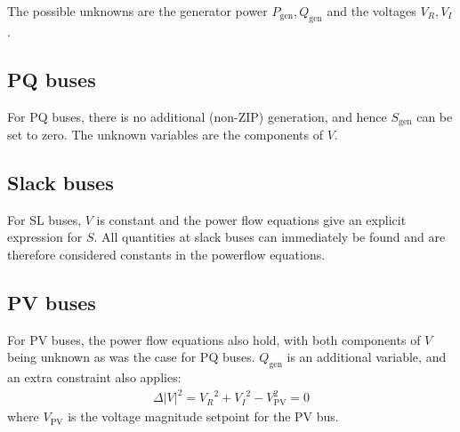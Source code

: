 \documentclass[10pt]{article}
\newcommand{\Vr}{{V_R}}
\newcommand{\Vi}{{V_I}}
\begin{document}
The possible unknowns are the generator power $P_\text{gen}, Q_\text{gen}$ and the voltages $\Vr, \Vi$.

\subsection{PQ buses}
For PQ buses, there is no additional (non-ZIP) generation, and hence $S_{\text{gen}}$ can be set to zero. The unknown variables are the components of $V$.
\subsection{Slack buses}
For SL buses, $V$ is constant and the power flow equations give an explicit expression for $S$. All quantities at slack buses can immediately be found and are therefore considered constants in the powerflow equations.
\subsection{PV buses}
For PV buses, the power flow equations also hold, with both components of $V$ being unknown as was the case for PQ buses. $Q_{\text{gen}}$ is an additional variable, and an extra constraint also applies:
\begin{align}
\Delta |V|^2 = \Vr^2 + \Vi^2 - V_\text{PV}^2 = 0
\label{EQ_POWERFLOW_PV_CONSTRAINT}
\end{align}
where $V_{\text{PV}}$ is the voltage magnitude setpoint for the PV bus.
\end{document}
